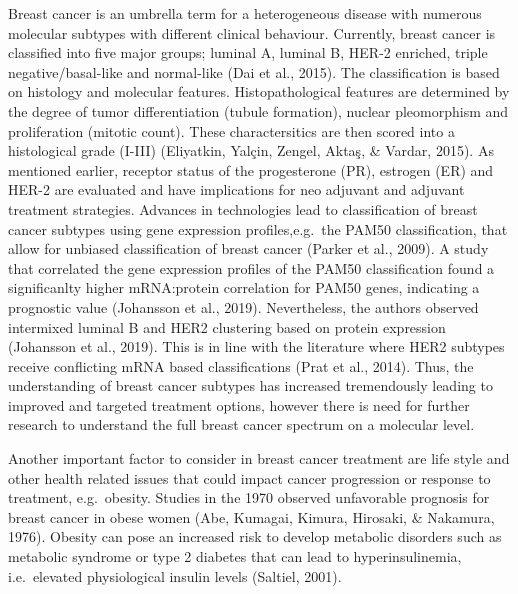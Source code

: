 \documentclass[12pt,openany]{book}
\begin{document}
Breast cancer is an umbrella term for a heterogeneous disease with
numerous molecular subtypes with different clinical behaviour.
Currently, breast cancer is classified into five major groups; luminal
A, luminal B, HER-2 enriched, triple negative/basal-like and normal-like
(Dai et al., 2015). The classification is based on histology and
molecular features. Histopathological features are determined by the
degree of tumor differentiation (tubule formation), nuclear pleomorphism
and proliferation (mitotic count). These charactersitics are then scored
into a histological grade (I-III) (Eliyatkin, Yalçin, Zengel, Aktaş, \&
Vardar, 2015). As mentioned earlier, receptor status of the progesterone
(PR), estrogen (ER) and HER-2 are evaluated and have implications for
neo adjuvant and adjuvant treatment strategies. Advances in technologies
lead to classification of breast cancer subtypes using gene expression
profiles,e.g.~the PAM50 classification, that allow for unbiased
classification of breast cancer (Parker et al., 2009). A study that
correlated the gene expression profiles of the PAM50 classification
found a significanlty higher mRNA:protein correlation for PAM50 genes,
indicating a prognostic value (Johansson et al., 2019). Nevertheless,
the authors observed intermixed luminal B and HER2 clustering based on
protein expression (Johansson et al., 2019). This is in line with the
literature where HER2 subtypes receive conflicting mRNA based
classifications (Prat et al., 2014). Thus, the understanding of breast
cancer subtypes has increased tremendously leading to improved and
targeted treatment options, however there is need for further research
to understand the full breast cancer spectrum on a molecular level.

Another important factor to consider in breast cancer treatment are life
style and other health related issues that could impact cancer
progression or response to treatment, e.g.~obesity. Studies in the 1970
observed unfavorable prognosis for breast cancer in obese women (Abe,
Kumagai, Kimura, Hirosaki, \& Nakamura, 1976). Obesity can pose an
increased risk to develop metabolic disorders such as metabolic syndrome
or type 2 diabetes that can lead to hyperinsulinemia, i.e.~elevated
physiological insulin levels (Saltiel, 2001).
\end{document}
